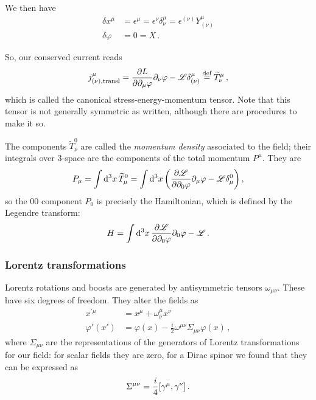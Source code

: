 \documentclass[main.tex]{subfiles}
\begin{document}
We then have 
%
\begin{align}
\delta x^{\mu } &= \epsilon^{\mu } = \epsilon^{\nu } \delta^{\mu }_{\nu } = \epsilon^{(\nu)} Y^{\mu }_{(\nu )}  \\
\delta \varphi &= 0 = X
\,.
\end{align}

So, our conserved current reads 
%
\begin{align}
j^{\mu } _{(\nu), \text{transl}} = \pdv{L}{\partial_{\mu } \varphi } \partial_{\nu } \varphi  -  \mathscr{L} \delta^{\mu }_{(\nu )} \overset{\text{def}}{=} \widetilde{T}^{\mu }_{\nu }
\,,
\end{align}
%
which is called the canonical stress-energy-momentum tensor.
Note that this tensor is not generally symmetric as written, although there are procedures to make it so. 

The components \(\widetilde{T}^{0}_{\nu }\) are called the \emph{momentum density} associated to the field; their integrals over 3-space are the components of the total momentum \(P^{\mu }\). They are 
%
\begin{align}
P_{\mu } = \int \dd[3]{x} \widetilde{T}^{0}_{\mu } = \int \dd[3]{x} \qty(\pdv{\mathscr{L}}{\partial_{0} \varphi } \partial_{\mu } \varphi  - \mathscr{L} \delta^{0}_{\mu })
\,,
\end{align}
%
so the \(00\) component \(P_{0}\) is precisely the Hamiltonian, which is defined by the Legendre transform: 
%
\begin{align}
H = \int \dd[3]{x} \pdv{\mathscr{L}}{\partial_{0} \varphi } \partial_{0} \varphi - \mathscr{L}
\,.
\end{align}

\subsubsection{Lorentz transformations}

Lorentz rotations and boosts are generated by antisymmetric tensors \(\omega_{\mu \nu  }\). These have six degrees of freedom. They alter the fields as 
%
\begin{align}
x^{\prime \mu } &= x^{\mu } + \omega^{\mu }_{\nu }x^{\nu }  \\
\varphi '(x') &= \varphi (x) - \frac{i}{2} \omega^{\mu \nu } \Sigma_{\mu \nu } \varphi (x)
\,,
\end{align}
%
where \(\Sigma_{\mu \nu }\) are the representations of the generators of Lorentz transformations for our field: for scalar fields they are zero, for a Dirac spinor we found that they can be expressed as 
%
\begin{align}
\Sigma^{\mu \nu } = \frac{i}{4} \qty[\gamma^{\mu }, \gamma^{\nu }]
\,.
\end{align}
\end{document}
